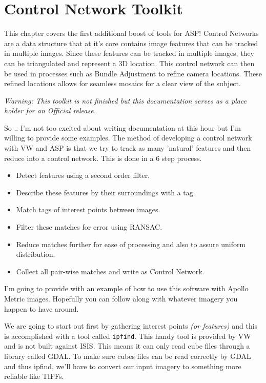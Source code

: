 \chapter{Control Network Toolkit}
\label{ch:controlnettk}

This chapter covers the first additional boost of tools for \ac{ASP}!
Control Networks are a data structure that at it's core contains image
features that can be tracked in multiple images. Since these features
can be tracked in multiple images, they can be triangulated and
represent a 3D location. This control network can then be used in
processes such as Bundle Adjustment to refine camera locations. These
refined locations allows for seamless mosaics for a clear view of the
subject.

\emph{Warning: This toolkit is not finished but this documentation
  serves as a place holder for an Official release.}

So .. I'm not too excited about writing documentation at this hour but
I'm willing to provide some examples. The method of developing a
control network with \ac{VW} and \ac{ASP} is that we try to track as
many 'natural' features and then reduce into a control network. This
is done in a 6 step process.

\begin{itemize}
\item Detect features using a second order filter.
\item Describe these features by their surroundings with a tag.
\item Match tags of interest points between images.
\item Filter these matches for error using RANSAC.
\item Reduce matches further for ease of processing and also to assure uniform distribution.
\item Collect all pair-wise matches and write as Control Network.
\end{itemize}

I'm going to provide with an example of how to use this software with
Apollo Metric images. Hopefully you can follow along with whatever
imagery you happen to have around.

We are going to start out first by gathering interest points \emph{(or
  features)} and this is accomplished with a tool called
\texttt{ipfind}. This handy tool is provided by \ac{VW} and is not
built against ISIS. This means it can only read cube files through a
library called GDAL. To make sure cubes files can be read correctly by
GDAL and thus ipfind, we'll have to convert our input imagery to
something more reliable like TIFFs.

